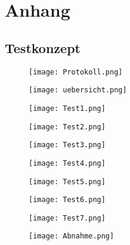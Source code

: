 \section{Anhang} \label{sec:anhang}



\subsection{Testkonzept} \label{subsec:eltech}
\begin{figure}[H]
	\centering
	\texttt{[image: Protokoll.png]}
	\label{fig:Protokoll}
\end{figure}

\begin{figure}[H]
	\centering
	\texttt{[image: uebersicht.png]}
	\label{fig:übersicht}
\end{figure}

\begin{figure}[H]
	\centering
	\texttt{[image: Test1.png]}
	\label{fig:Test1}
\end{figure}

\begin{figure}[H]
	\centering
	\texttt{[image: Test2.png]}
	\label{fig:Test2}
\end{figure}

\begin{figure}[H]
	\centering
	\texttt{[image: Test3.png]}
	\label{fig:Test3}
\end{figure}

\begin{figure}[H]
	\centering
	\texttt{[image: Test4.png]}
	\label{fig:Test4}
\end{figure}

\begin{figure}[H]
	\centering
	\texttt{[image: Test5.png]}
	\label{fig:Test5}
\end{figure}

\begin{figure}[H]
	\centering
	\texttt{[image: Test6.png]}
	\label{fig:Test6}
\end{figure}

\begin{figure}[H]
	\centering
	\texttt{[image: Test7.png]}
	\label{fig:Test7}
\end{figure}

\begin{figure}[H]
	\centering
	\texttt{[image: Abnahme.png]}
	\label{fig:Protokoll}
\end{figure}